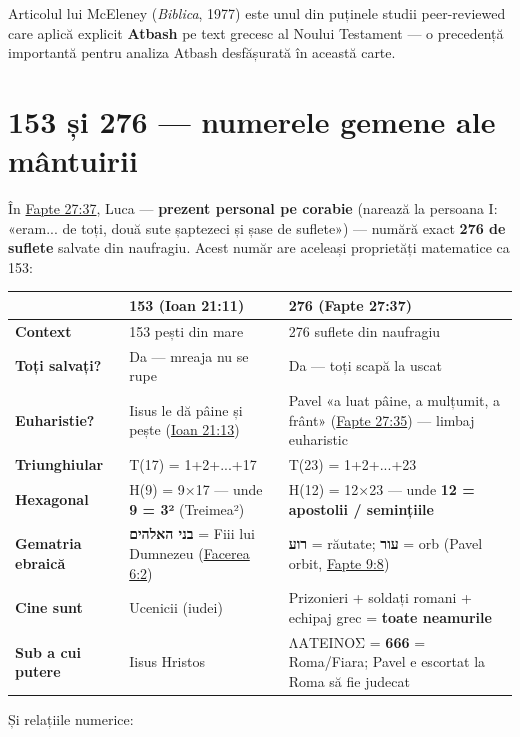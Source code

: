 \documentclass[12pt,a4paper,twoside,openany]{book}
\begin{document}
Articolul lui McEleney (\textit{Biblica}, 1977) este unul din puținele studii peer-reviewed care aplică explicit \textbf{Atbash} pe text grecesc al Noului Testament --- o precedență importantă pentru analiza Atbash desfășurată în această carte.


\section{153 și 276 — numerele gemene ale mântuirii}
În \href{https://bibliaortodoxa.ro/carte.php?id=26\&cap=27\#37}{Fapte 27:37}, Luca — \textbf{prezent personal pe corabie} (narează la persoana I: «eram... de toți, două sute șaptezeci și șase de suflete») — numără exact \textbf{276 de suflete} salvate din naufragiu. Acest număr are aceleași proprietăți matematice ca 153:

\small
\begin{longtable}{L{1.8cm}L{4.8cm}L{8.3cm}}
\toprule
{}
 & \textbf{153 (Ioan 21:11)} & \textbf{276 (Fapte 27:37)} \\
\midrule
\endhead
\textbf{Context} & 153 pești din mare & 276 suflete din naufragiu \\
\textbf{Toți salvați?} & Da — mreaja nu se rupe & Da — toți scapă la uscat \\
\textbf{Euharistie?} & Iisus le dă pâine și pește (\href{https://bibliaortodoxa.ro/carte.php?id=35\&cap=21\#13}{Ioan 21:13}) & Pavel «a luat pâine, a mulțumit, a frânt» (\href{https://bibliaortodoxa.ro/carte.php?id=26\&cap=27\#35}{Fapte 27:35}) — limbaj euharistic \\
\textbf{Triunghiular} & T(17) = 1+2+...+17 & T(23) = 1+2+...+23 \\
\textbf{Hexagonal} & H(9) = 9×17 — unde \textbf{9 = 3²} (Treimea²) & H(12) = 12×23 — unde \textbf{12 = apostolii / semințiile} \\
\textbf{Gematria ebraică} & \textbf{בני האלהים} = Fiii lui Dumnezeu (\href{https://bibliaortodoxa.ro/carte.php?id=25\&cap=6\#2}{Facerea 6:2}) & \textbf{רוע} = răutate; \textbf{עור} = orb (Pavel orbit, \href{https://bibliaortodoxa.ro/carte.php?id=26\&cap=9\#8}{Fapte 9:8}) \\
\textbf{Cine sunt} & Ucenicii (iudei) & Prizonieri + soldați romani + echipaj grec = \textbf{toate neamurile} \\
\textbf{Sub a cui putere} & Iisus Hristos & ΛΑΤΕΙΝΟΣ = \textbf{666} = Roma/Fiara; Pavel e escortat la Roma să fie judecat \\
\bottomrule
\end{longtable}
\normalsize
Și relațiile numerice:
\end{document}
